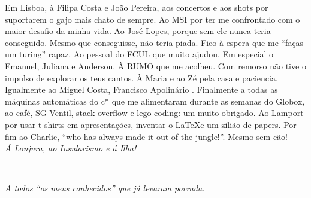 
Em Lisboa, à Filipa Costa e João Pereira, aos concertos e aos shots por suportarem o gajo mais chato de sempre. 
Ao MSI por ter me confrontado  com o maior desafio da minha vida. 
Ao José Lopes, porque sem ele nunca teria conseguido. Mesmo que conseguisse, não teria piada. Fico à espera que me ``faças um turing'' rapaz. 
Ao pessoal do FCUL que muito ajudou. Em especial o Emanuel, Juliana e Anderson. 
À RUMO que me acolheu. Com remorso não tive o impulso de explorar os teus cantos. 
À Maria e ao Zé pela casa e paciencia. Igualmente ao Miguel Costa, Francisco Apolinário . 
Finalmente a todas as máquinas automáticas do c* que me alimentaram durante as semanas do Globox, ao café, SG Ventil, stack-overflow e lego-coding: um muito obrigado. Ao Lamport por usar t-shirts em apresentações, inventar o \LaTeX e um zilião de papers. 
Por fim ao Charlie, ``who has always made it out of the jungle!''. Mesmo sem cão!\\ 

\emph{Á Lonjura, ao Insularismo e  á Ilha!} \\



\LIMPA
\LIMPA

~
\vfill

\begin{flushright}\textit{A todos ``os meus conhecidos''  que já levaram porrada. }\end{flushright}

\LIMPA

